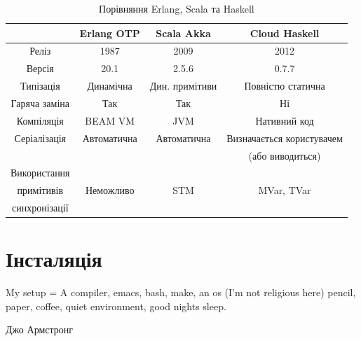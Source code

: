 \documentclass[12pt]{article}
\begin{document}
\begin {table}[H]
\begin{center}
\begin{tabular}{ c|c|c|c } 
              & Erlang OTP  & Scala Akka           & Cloud Haskell            \\
\hline
Реліз         & 1987        & 2009                 & 2012                     \\ 

Версія        & 20.1        & 2.5.6                & 0.7.7                    \\ 

Типізація     & Динамічна   & Дин. примітиви       & Повністю статична        \\ 

Гаряча заміна & Так         & Так                  & Ні                       \\ 

Компіляція    & BEAM VM     & JVM                  & Нативний код             \\ 

Серіалізація  & Автоматична & Автоматична          & Визначається користувачем\\ 
              &             &                      & (або виводиться)         \\ 

Використання  &             &                      &                          \\
примітивів    & Неможливо   & STM                  & MVar, TVar               \\ 
синхронізації &             &                      &                          \\

\end{tabular}
\caption {Порівняння Erlang, Scala та Haskell}
\label{comparisonTable}
\end{center}
\end {table}

\section{Інсталяція}

\epigraph{My setup = A compiler, emacs, bash, make, an os (I'm not religious here) pencil, paper, coffee, quiet environment, good nights sleep.}{Джо Армстронг}
\end{document}
